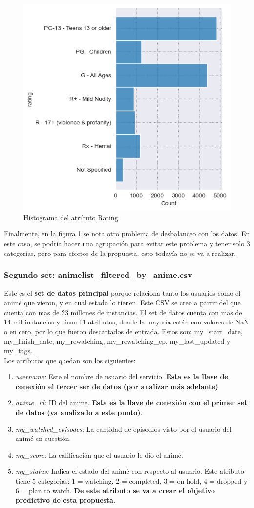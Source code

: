 \documentclass[a4paper]{article}
\begin{document}
\begin{figure}[hbtp!]
    \centering
    \includegraphics[width=0.5\linewidth]{Module_4_BigData//Proyecto//Propuestas//Imagenes/p2_dataset1_rating_histogram.png}
    \caption{Histograma del atributo Rating}
    \label{fig:hist_p2_dataset1_rating}
\end{figure}

Finalmente, en la figura \ref{fig:hist_p2_dataset1_rating} se nota otro problema de desbalanceo con los datos. En este caso, se podría hacer una agrupación para evitar este problema y tener solo 3 categorías, pero para efectos de la propuesta, esto todavía no se va a realizar.


\subsubsection{Segundo set: animelist\_filtered\_by\_anime.csv}
Este es el \textbf{set de datos principal} porque relaciona tanto los usuarios como el animé que vieron, y en cual estado lo tienen. Este CSV se creo a partir del que cuenta con mas de 23 millones de instancias. El set de datos cuenta con mas de 14 mil instancias y tiene 11 atributos, donde la mayoría están con valores de NaN o en cero, por lo que fueron descartados de entrada. Estos son: my\_start\_date, my\_finish\_date, my\_rewatching, my\_rewatching\_ep, my\_last\_updated y my\_tags.\\

Los atributos que quedan son los siguientes:
\begin{enumerate}
    \item \textit{username:} Este el nombre de usuario del servicio. \textbf{Esta es la llave de conexión el tercer ser de datos (por analizar más adelante)}
    \item \textit{anime\_id:} ID del anime. \textbf{Esta es la llave de conexión con el primer set de datos (ya analizado a este punto)}.
    \item \textit{my\_watched\_episodes:} La cantidad de episodios visto por el usuario del animé en cuestión.
    \item \textit{my\_score:} La calificación que el usuario le dio el animé.
    \item \textit{my\_status:} Indica el estado del animé con respecto al usuario. Este atributo tiene 5 categorias: 1 = watching, 2 = completed, 3 = on hold, 4 = dropped y 6 = plan to watch. \textbf{De este atributo se va a crear el objetivo predictivo de esta propuesta.}
\end{enumerate}
\end{document}
